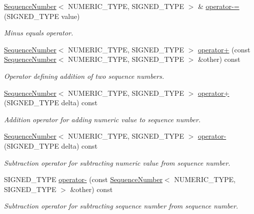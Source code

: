 \begin{DoxyCompactItemize}
\hyperlink{classns3_1_1SequenceNumber}{Sequence\+Number}$<$ N\+U\+M\+E\+R\+I\+C\+\_\+\+T\+Y\+PE, S\+I\+G\+N\+E\+D\+\_\+\+T\+Y\+PE $>$ \& \hyperlink{classns3_1_1SequenceNumber_a912c450a2c22d9eb40d083332afafaab}{operator-\/=} (S\+I\+G\+N\+E\+D\+\_\+\+T\+Y\+PE value)
\begin{DoxyCompactList}\small\item\em Minus equals operator. \end{DoxyCompactList}\item 
\hyperlink{classns3_1_1SequenceNumber}{Sequence\+Number}$<$ N\+U\+M\+E\+R\+I\+C\+\_\+\+T\+Y\+PE, S\+I\+G\+N\+E\+D\+\_\+\+T\+Y\+PE $>$ \hyperlink{classns3_1_1SequenceNumber_a782c00ca4609775f7a4b66ad9ebd4a3c}{operator+} (const \hyperlink{classns3_1_1SequenceNumber}{Sequence\+Number}$<$ N\+U\+M\+E\+R\+I\+C\+\_\+\+T\+Y\+PE, S\+I\+G\+N\+E\+D\+\_\+\+T\+Y\+PE $>$ \&other) const 
\begin{DoxyCompactList}\small\item\em Operator defining addition of two sequence numbers. \end{DoxyCompactList}\item 
\hyperlink{classns3_1_1SequenceNumber}{Sequence\+Number}$<$ N\+U\+M\+E\+R\+I\+C\+\_\+\+T\+Y\+PE, S\+I\+G\+N\+E\+D\+\_\+\+T\+Y\+PE $>$ \hyperlink{classns3_1_1SequenceNumber_a4f8ed09aa0f6a07a0f967b7c846bda3e}{operator+} (S\+I\+G\+N\+E\+D\+\_\+\+T\+Y\+PE delta) const 
\begin{DoxyCompactList}\small\item\em Addition operator for adding numeric value to sequence number. \end{DoxyCompactList}\item 
\hyperlink{classns3_1_1SequenceNumber}{Sequence\+Number}$<$ N\+U\+M\+E\+R\+I\+C\+\_\+\+T\+Y\+PE, S\+I\+G\+N\+E\+D\+\_\+\+T\+Y\+PE $>$ \hyperlink{classns3_1_1SequenceNumber_a44c19f72f3a8cb8a5d56fd4fb5dc1727}{operator-\/} (S\+I\+G\+N\+E\+D\+\_\+\+T\+Y\+PE delta) const 
\begin{DoxyCompactList}\small\item\em Subtraction operator for subtracting numeric value from sequence number. \end{DoxyCompactList}\item 
S\+I\+G\+N\+E\+D\+\_\+\+T\+Y\+PE \hyperlink{classns3_1_1SequenceNumber_afe104ad80cd2acdf96bb2d3f37d2b15a}{operator-\/} (const \hyperlink{classns3_1_1SequenceNumber}{Sequence\+Number}$<$ N\+U\+M\+E\+R\+I\+C\+\_\+\+T\+Y\+PE, S\+I\+G\+N\+E\+D\+\_\+\+T\+Y\+PE $>$ \&other) const 
\begin{DoxyCompactList}\small\item\em Subtraction operator for subtracting sequence number from sequence number. \end{DoxyCompactList}\item 

\end{DoxyCompactItemize}
